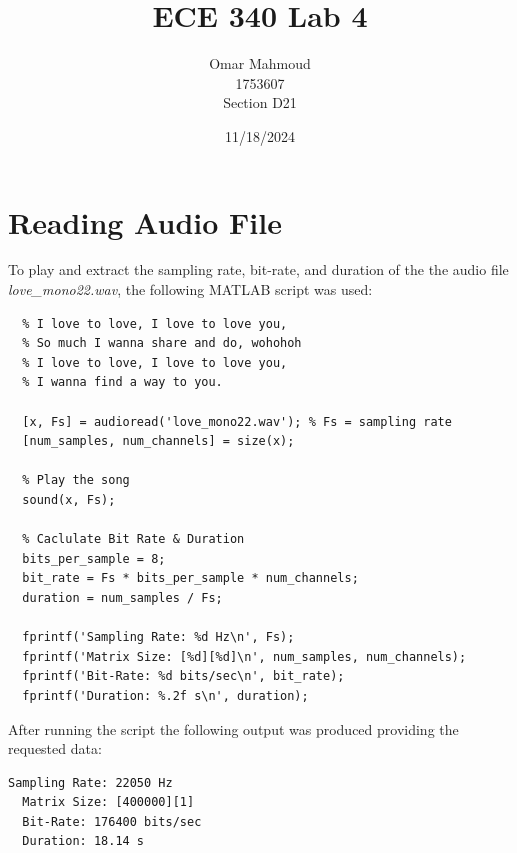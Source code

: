 \documentclass[a4paper, 10pt]{article}
\title{ECE 340 Lab 4}
\author{Omar Mahmoud\\1753607\\Section D21}
\date{11/18/2024}
\begin{document}
\thispagestyle{empty}
\vfill
\maketitle
\vfill

\newpage

\section{Reading Audio File}
To play and extract the sampling rate, bit-rate, and duration of the the audio file \textit{love\_mono22.wav},
the following MATLAB script was used:
\begin{lstlisting}[style=Matlab-editor, basicstyle=\small\ttfamily]
  %% First few words of love_mono22.wav:
  % I love to love, I love to love you,
  % So much I wanna share and do, wohohoh
  % I love to love, I love to love you,
  % I wanna find a way to you.
  
  [x, Fs] = audioread('love_mono22.wav'); % Fs = sampling rate
  [num_samples, num_channels] = size(x);
  
  % Play the song
  sound(x, Fs);
  
  % Caclulate Bit Rate & Duration
  bits_per_sample = 8;
  bit_rate = Fs * bits_per_sample * num_channels;
  duration = num_samples / Fs;
  
  fprintf('Sampling Rate: %d Hz\n', Fs);
  fprintf('Matrix Size: [%d][%d]\n', num_samples, num_channels);
  fprintf('Bit-Rate: %d bits/sec\n', bit_rate);
  fprintf('Duration: %.2f s\n', duration);
\end{lstlisting}
After running the script the following output was produced providing the requested data:
\begin{lstlisting}[basicstyle=\small\ttfamily]
  Sampling Rate: 22050 Hz
  Matrix Size: [400000][1]
  Bit-Rate: 176400 bits/sec
  Duration: 18.14 s
\end{lstlisting}

\end{document}
